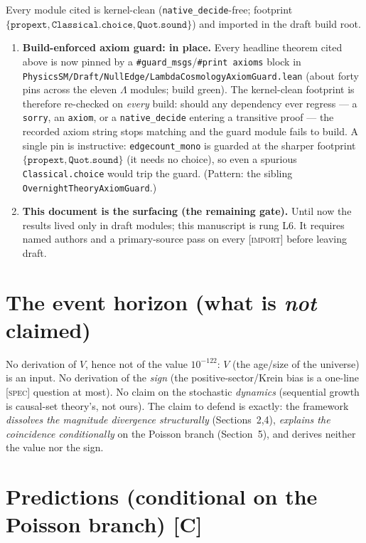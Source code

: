 \documentclass[11pt]{article}
\newcommand{\Lam}{\Lambda}
\newcommand{\Import}{\textcolor{icol}{\textsc{[import]}}} %
\newcommand{\Conj}{\textcolor{ccol}{\textsc{[C]}}}        %
\newcommand{\Spec}{\textcolor{scol}{\textsc{[spec]}}}     %
\newcommand{\lm}[1]{\texttt{#1}}
\begin{document}
Every module cited is kernel-clean (\texttt{native\_decide}-free; footprint
$\{\texttt{propext},\texttt{Classical.choice},\texttt{Quot.sound}\}$) and
imported in the draft build root.
\begin{enumerate}[leftmargin=1.6em,itemsep=1pt]
\item \textbf{Build-enforced axiom guard: in place.}  Every headline theorem
  cited above is now pinned by a \lm{\#guard\_msgs}/\lm{\#print axioms} block in
  \lm{PhysicsSM/Draft/NullEdge/LambdaCosmologyAxiomGuard.lean} (about forty pins
  across the eleven $\Lam$ modules; build green).  The kernel-clean footprint is
  therefore re-checked on \emph{every} build: should any dependency ever regress
  --- a \texttt{sorry}, an \texttt{axiom}, or a \texttt{native\_decide} entering
  a transitive proof --- the recorded axiom string stops matching and the guard
  module fails to build.  A single pin is instructive: \lm{edgecount\_mono} is
  guarded at the sharper footprint $\{\texttt{propext},\texttt{Quot.sound}\}$
  (it needs no choice), so even a spurious \texttt{Classical.choice} would trip
  the guard.  (Pattern: the sibling \lm{OvernightTheoryAxiomGuard}.)
\item \textbf{This document is the surfacing (the remaining gate).}  Until now
  the results lived only in draft modules; this manuscript is rung L6.  It
  requires named authors and a primary-source pass on every \Import{} before
  leaving draft.
\end{enumerate}

\section{The event horizon (what is \emph{not} claimed)}

No derivation of $V$, hence not of the value $10^{-122}$: $V$ (the age/size of
the universe) is an input.  No derivation of the \emph{sign} (the
positive-sector/Krein bias is a one-line \Spec{} question at most).  No claim on
the stochastic \emph{dynamics} (sequential growth is causal-set theory's, not
ours).  The claim to defend is exactly: the framework \emph{dissolves the
magnitude divergence structurally} (Sections~2,4), \emph{explains the
coincidence conditionally} on the Poisson branch (Section~5), and derives
neither the value nor the sign.

\section{Predictions (conditional on the Poisson branch) \Conj}
\end{document}
